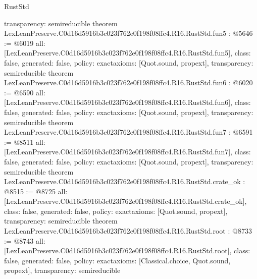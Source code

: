 \begin{lexlean}{RustStd}
\begin{coremodule}
{  transparency: semireducible
}
theorem LexLeanPreserve.C0d16d5916b3c023f762e0f198f08ffc4.R16.RustStd.fun5 : @5646 := @6019 {
  all: [LexLeanPreserve.C0d16d5916b3c023f762e0f198f08ffc4.R16.RustStd.fun5],
  class: false,
  generated: false,
  policy: exact{axioms: [Quot.sound, propext]},
  transparency: semireducible
}
theorem LexLeanPreserve.C0d16d5916b3c023f762e0f198f08ffc4.R16.RustStd.fun6 : @6020 := @6590 {
  all: [LexLeanPreserve.C0d16d5916b3c023f762e0f198f08ffc4.R16.RustStd.fun6],
  class: false,
  generated: false,
  policy: exact{axioms: [Quot.sound, propext]},
  transparency: semireducible
}
theorem LexLeanPreserve.C0d16d5916b3c023f762e0f198f08ffc4.R16.RustStd.fun7 : @6591 := @8511 {
  all: [LexLeanPreserve.C0d16d5916b3c023f762e0f198f08ffc4.R16.RustStd.fun7],
  class: false,
  generated: false,
  policy: exact{axioms: [Quot.sound, propext]},
  transparency: semireducible
}
theorem LexLeanPreserve.C0d16d5916b3c023f762e0f198f08ffc4.R16.RustStd.crate_ok : @8515 := @8725 {
  all: [LexLeanPreserve.C0d16d5916b3c023f762e0f198f08ffc4.R16.RustStd.crate_ok],
  class: false,
  generated: false,
  policy: exact{axioms: [Quot.sound, propext]},
  transparency: semireducible
}
theorem LexLeanPreserve.C0d16d5916b3c023f762e0f198f08ffc4.R16.RustStd.root : @8733 := @8743 {
  all: [LexLeanPreserve.C0d16d5916b3c023f762e0f198f08ffc4.R16.RustStd.root],
  class: false,
  generated: false,
  policy: exact{axioms: [Classical.choice, Quot.sound, propext]},
  transparency: semireducible
}


\end{coremodule}
\end{lexlean}

